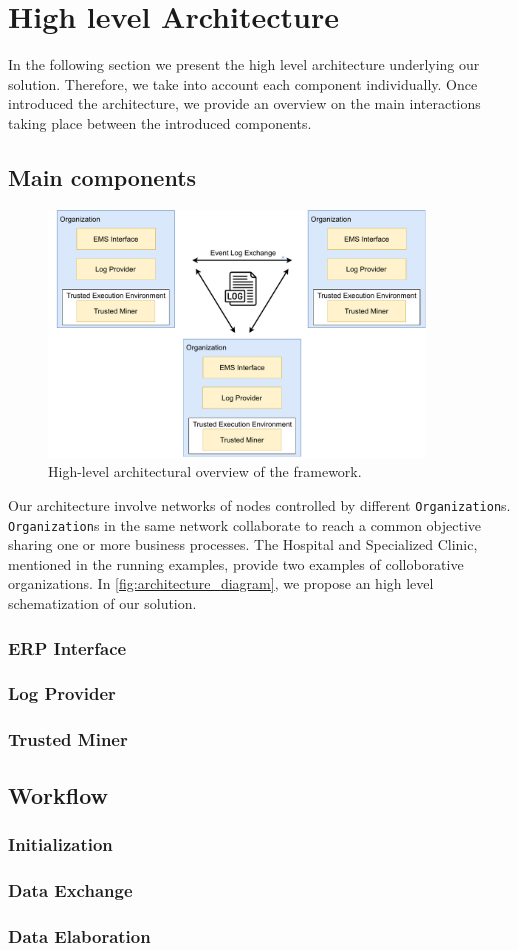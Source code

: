\section{High level Architecture}
In the following section we present the high level architecture underlying our solution. Therefore, we take into account each component individually. Once introduced the architecture, we provide an overview on the main interactions taking place between the introduced components.
\subsection{Main components}
\label{sec:architecture_diagram}
\begin{figure}[t]
\centering
\includegraphics[width=10cm]{content/figures/architecture_diagram.pdf}
\caption{High-level architectural overview of the framework.}
\label{fig:implementation}
\end{figure}
Our architecture involve networks of nodes controlled by different \texttt{Organization}s. \texttt{Organization}s in the same network collaborate to reach a common objective sharing one or more business processes. The Hospital and Specialized Clinic, mentioned in the running examples, provide two examples of colloborative organizations. In \ref{fig:architecture_diagram}, we propose an high level schematization of our solution.
\subsubsection{ERP Interface}
\subsubsection{Log Provider}
\subsubsection{Trusted Miner}
\subsection{Workflow}
\subsubsection{Initialization}
\subsubsection{Data Exchange}
\subsubsection{Data Elaboration}



